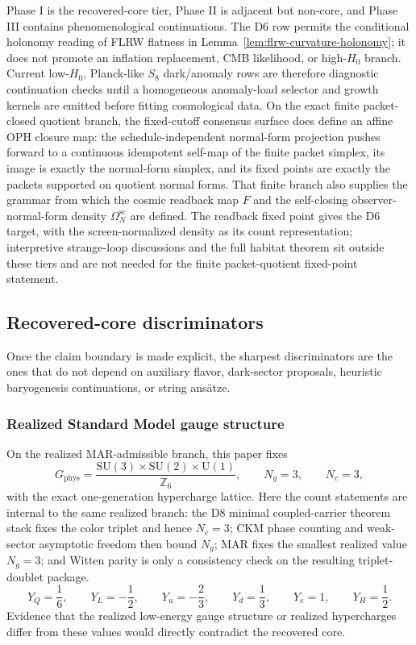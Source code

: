 \documentclass[11pt]{article}
\newcommand{\SU}{\mathrm{SU}}
\newcommand{\U}{\mathrm{U}}
\begin{document}
Phase I is the recovered-core tier, Phase II is adjacent but non-core, and Phase III contains phenomenological continuations. The D6 row permits the conditional holonomy reading of FLRW flatness in Lemma~\ref{lem:flrw-curvature-holonomy}; it does not promote an inflation replacement, CMB likelihood, or high-\(H_0\) branch. Current low-\(H_0\), Planck-like \(S_8\) dark/anomaly rows are therefore diagnostic continuation checks until a homogeneous anomaly-load selector and growth kernels are emitted before fitting cosmological data. On the exact finite packet-closed quotient branch, the fixed-cutoff consensus surface does define an affine OPH closure map: the schedule-independent normal-form projection pushes forward to a continuous idempotent self-map of the finite packet simplex, its image is exactly the normal-form simplex, and its fixed points are exactly the packets supported on quotient normal forms. That finite branch also supplies the grammar from which the cosmic readback map \(F\) and the self-closing observer-normal-form density \(\Omega^{\mathrm{sc}}_N\) are defined. The readback fixed point gives the D6 target, with the screen-normalized density as its count representation; interpretive strange-loop discussions and the full habitat theorem sit outside these tiers and are not needed for the finite packet-quotient fixed-point statement.

\subsection{Recovered-core discriminators}

Once the claim boundary is made explicit, the sharpest discriminators are the ones that do not depend on auxiliary flavor, dark-sector proposals, heuristic baryogenesis continuations, or string ans\"atze.

\subsubsection{Realized Standard Model gauge structure}

On the realized MAR-admissible branch, this paper fixes
\[
G_{\mathrm{phys}}=
\frac{\SU(3)\times\SU(2)\times\U(1)}{\mathbb Z_6},
\qquad
N_g=3,
\qquad
N_c=3,
\]
with the exact one-generation hypercharge lattice. Here the count statements are internal to the same realized branch: the D8 minimal coupled-carrier theorem stack fixes the color triplet and hence \(N_c=3\); CKM phase counting and weak-sector asymptotic freedom then bound \(N_g\); MAR fixes the smallest realized value \(N_g=3\); and Witten parity is only a consistency check on the resulting triplet-doublet package.
\[
Y_Q=\frac16,\qquad
Y_L=-\frac12,\qquad
Y_u=-\frac23,\qquad
Y_d=\frac13,\qquad
Y_e=1,\qquad
Y_H=\frac12.
\]
Evidence that the realized low-energy gauge structure or realized hypercharges differ from these values would directly contradict the recovered core.
\end{document}
